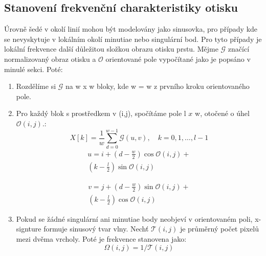 \documentclass[a4paper,11pt]{article}
\begin{document}
\begin{multicols*}{2}
    \subsection{Stanovení frekvenční charakteristiky otisku}
    Úrovně šedé v okolí linií mohou být modelovány jako sinusovka, pro případy kde se nevyskytuje v lokálním okolí minutiae nebo singulární bod. Pro tyto případy je lokální frekvence další důležitou složkou obrazu otisku prstu. Mějme $\mathcal{G}$ značící normalizovaný obraz otisku a $\mathcal{O}$ orientované pole vypočítané jako je popsáno v minulé sekci. Poté:
    \begin{enumerate}
        \item Rozdělíme si $\mathcal{G}$ na w x w bloky, kde w = w z prvního kroku orientovaného pole.
        \item  Pro každý blok s prostředkem v (i,j), spočítáme pole l $x$ w, otočené o úhel $\mathcal{O}(i,j)$.:
              \begin{equation}
                X[k]=\frac{1}{w} \sum_{d=0}^{w-1} \mathcal{G}(u, v), \quad k=0,1, \ldots, l-1
             \end{equation}
             \begin{equation}
                \begin{multlined}
                    u=i+\left(d-\frac{w}{2}\right) \cos \mathcal{O}(i, j)+\\
                    \left(k-\frac{l}{2}\right) \sin \mathcal{O}(i, j)
                \end{multlined}
             \end{equation}
             
             \begin{equation}
                \begin{multlined}
                    v=j+\left(d-\frac{w}{2}\right) \sin \mathcal{O}(i, j)+\\ 
                    \left(k-\frac{l}{2}\right) \cos \mathcal{O}(i, j)
                \end{multlined}
             \end{equation}
        \item Pokud se žádné singulární ani minutiae body neobjeví v orientovaném poli, x-signture formuje sinusový tvar vlny. Nechť $\mathcal{T}(i,j)$ je průměrný počet pixelů mezi dvěma vrcholy. Poté je frekvence stanovena jako:
        \begin{equation}
            \Omega(i, j)=1 / \mathcal{T}(i, j)
         \end{equation}
    \end{enumerate}\cite{ori}
    

\end{multicols*}
\end{document}
